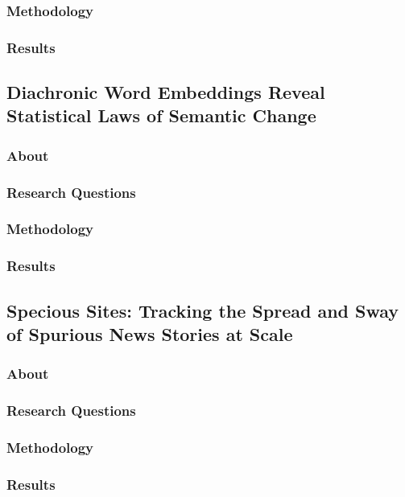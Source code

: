 \documentclass[12pt]{article}
\begin{document}
\subsubsection{Methodology}

\subsubsection{Results}

\subsection{Diachronic Word Embeddings Reveal Statistical Laws of Semantic Change}\label{subsec:diachronic-word-embeddings-reveal-statistical-laws-of-semantic-change}
\subsubsection{About}
\subsubsection{Research Questions}
\subsubsection{Methodology}
\subsubsection{Results}

\subsection{Specious Sites: Tracking the Spread and Sway of Spurious News Stories at Scale}\label{subsec:specious-sites:-tracking-the-spread-and-sway-of-spurious-news-stories-at-scale}
\subsubsection{About}
\subsubsection{Research Questions}
\subsubsection{Methodology}
\subsubsection{Results}




\end{document}
